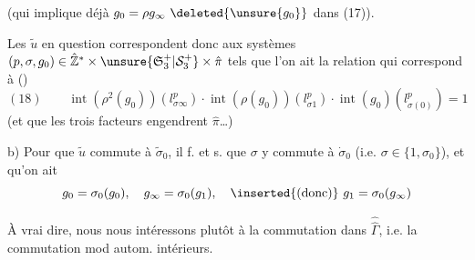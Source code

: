 (qui implique déjà $g_0=\rho g_\infty\ \deleted{\unsure{g_0}}$ dans (17)).

Les $\tilde u$ en question correspondent donc aux systèmes $(p,\sigma,g_0)\in\hat{\mathbb Z}^*\times\unsure{\mathfrak S_3^+|\mathcal S_3^+}\times\hat\pi$ tels que l'on ait la relation qui correspond à ()
\[
(18)\qquad\operatorname{int}(\rho^2(g_0))(l_{\sigma\infty}^p)\cdot\operatorname{int}(\rho(g_0))(l_{\sigma1}^p)\cdot\operatorname{int}(g_0)(l_{\sigma(0)}^p)=1
\]
(et que les trois facteurs engendrent $\hat\pi$\ldots)

b) Pour que $\tilde u$ commute à $\tilde\sigma_0$, il f. et s. que $\sigma$ y commute à $\dot\sigma_0$ (i.e. $\sigma\in\{1,\sigma_0\}$), et qu'on ait
\[
g_0=\sigma_0(g_0),\quad g_\infty=\sigma_0(g_1),\quad\inserted{\text{(donc)}}\ g_1=\sigma_0(g_\infty)
\]



À vrai dire, nous nous intéressons plutôt à la commutation dans $\widehat{\widehat\Gamma}$, i.e. la commutation mod autom. intérieurs.
